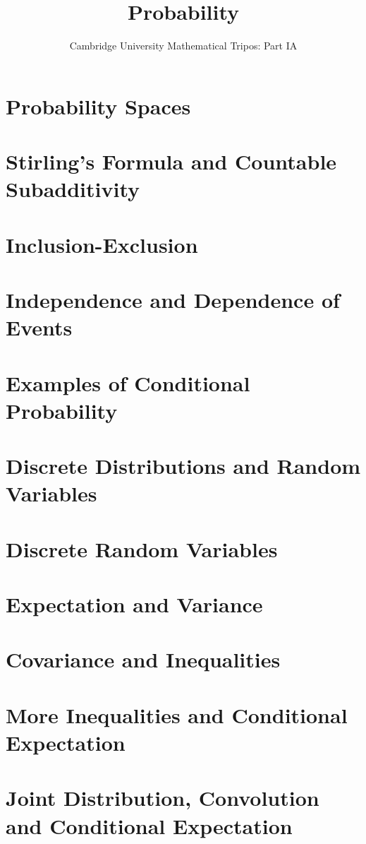 \documentclass{article}
\title{Probability}
\author{Cambridge University Mathematical Tripos: Part IA}
\begin{document}
\maketitle

\tableofcontentsnewpage{}

\section{Probability Spaces}

\section{Stirling's Formula and Countable Subadditivity}

\section{Inclusion-Exclusion}

\section{Independence and Dependence of Events}

\section{Examples of Conditional Probability}

\section{Discrete Distributions and Random Variables}

\section{Discrete Random Variables}

\section{Expectation and Variance}

\section{Covariance and Inequalities}

\section{More Inequalities and Conditional Expectation}

\section{Joint Distribution, Convolution and Conditional Expectation}

\end{document}
